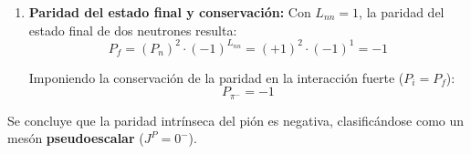 \begin{problema}
\begin{enumerate}[label=\arabic*.]
    \item \textbf{Paridad del estado final y conservación:}
    Con $L_{nn} = 1$, la paridad del estado final de dos neutrones resulta:
    \begin{equation*}
        P_f = (P_n)^2 \cdot (-1)^{L_{nn}} = (+1)^2 \cdot (-1)^1 = -1
    \end{equation*}

    Imponiendo la conservación de la paridad en la interacción fuerte ($P_i = P_f$):
    \begin{equation*}
        P_{\pi^-} = -1
    \end{equation*}
\end{enumerate}

Se concluye que la paridad intrínseca del pión es negativa, clasificándose como un mesón \textbf{pseudoescalar} ($J^P = 0^-$).
\end{problema}

